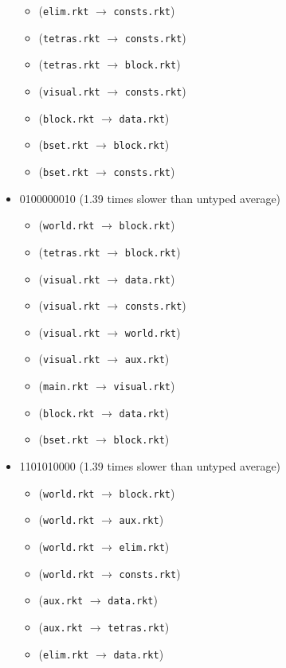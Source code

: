 \documentclass{article}
\newcommand{\mono}[1]{\texttt{#1}}
\begin{document}
\begin{itemize}
\begin{itemize}
  \item (\mono{elim.rkt} $\rightarrow$ \mono{consts.rkt})
  \item (\mono{tetras.rkt} $\rightarrow$ \mono{consts.rkt})
  \item (\mono{tetras.rkt} $\rightarrow$ \mono{block.rkt})
  \item (\mono{visual.rkt} $\rightarrow$ \mono{consts.rkt})
  \item (\mono{block.rkt} $\rightarrow$ \mono{data.rkt})
  \item (\mono{bset.rkt} $\rightarrow$ \mono{block.rkt})
  \item (\mono{bset.rkt} $\rightarrow$ \mono{consts.rkt})
  \end{itemize}
\item 0100000010 (1.39 times slower than untyped average)
  \begin{itemize}
  \item (\mono{world.rkt} $\rightarrow$ \mono{block.rkt})
  \item (\mono{tetras.rkt} $\rightarrow$ \mono{block.rkt})
  \item (\mono{visual.rkt} $\rightarrow$ \mono{data.rkt})
  \item (\mono{visual.rkt} $\rightarrow$ \mono{consts.rkt})
  \item (\mono{visual.rkt} $\rightarrow$ \mono{world.rkt})
  \item (\mono{visual.rkt} $\rightarrow$ \mono{aux.rkt})
  \item (\mono{main.rkt} $\rightarrow$ \mono{visual.rkt})
  \item (\mono{block.rkt} $\rightarrow$ \mono{data.rkt})
  \item (\mono{bset.rkt} $\rightarrow$ \mono{block.rkt})
  \end{itemize}
\item 1101010000 (1.39 times slower than untyped average)
  \begin{itemize}
  \item (\mono{world.rkt} $\rightarrow$ \mono{block.rkt})
  \item (\mono{world.rkt} $\rightarrow$ \mono{aux.rkt})
  \item (\mono{world.rkt} $\rightarrow$ \mono{elim.rkt})
  \item (\mono{world.rkt} $\rightarrow$ \mono{consts.rkt})
  \item (\mono{aux.rkt} $\rightarrow$ \mono{data.rkt})
  \item (\mono{aux.rkt} $\rightarrow$ \mono{tetras.rkt})
  \item (\mono{elim.rkt} $\rightarrow$ \mono{data.rkt})

\end{itemize}
\end{itemize}
\end{document}

